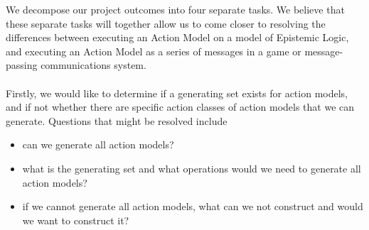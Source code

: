\documentclass[12pt, a4paper]{article}
\begin{document}
We decompose our project outcomes into four separate tasks.
We believe that these separate tasks will together allow us to come closer to
resolving the differences between executing an Action Model on a model of
Epistemic Logic, and executing an Action Model as a series of messages in a game
or message-passing communications system.\\
\\
Firstly, we would like to determine if a generating set exists for action
models, and if not whether there are specific action classes of action models
that we can generate.
Questions that might be resolved include
\begin{itemize}
	\item can we generate all action models?
	\item what is the generating set and what operations would we need to generate
	all action models?
	\item if we cannot generate all action models, what can we not construct and
	would we want to construct it?
\end{itemize}
\end{document}
